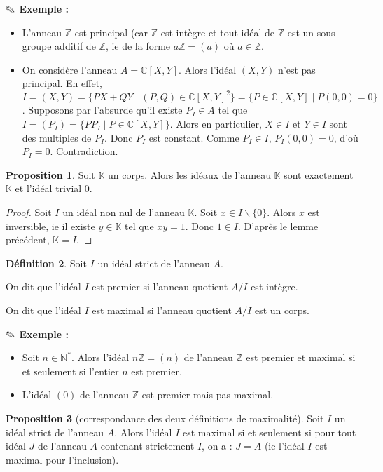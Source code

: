 \documentclass{article}
\newcommand{\Z}{\mathbb{Z}}
\newcommand{\C}{\mathbb{C}}
\newcommand{\K}{\mathbb{K}}
\newcommand{\N}{\mathbb{N}}
\theoremstyle{definition}
\newtheorem{defi}{Définition}[section]
\newtheorem{prop}[defi]{Proposition}
\theoremstyle{remark}
\newcommand{\exem}{{\textbf{$\text{\ding{46}}$ Exemple : \ }}}
\begin{document}
\exem 
\begin{itemize}
\item L'anneau $\Z$ est principal (car $\Z$ est intègre et tout idéal de $\Z$ est un sous-groupe additif de $\Z$, ie de la forme $a\Z=(a)$ où $a\in \Z$.
\item On considère l'anneau $A=\C[X,Y]$. Alors l'idéal $(X,Y)$ n'est pas principal. En effet, $I=(X,Y)=\{PX+QY \mid (P,Q) \in \C[X,Y]^2\}=\{P \in \C[X,Y] \mid P(0,0)=0\}$. Supposons par l'absurde qu'il existe $P_I \in A$ tel que $I=(P_I)=\{PP_I \mid P \in \C[X,Y]\}$. Alors en particulier, $X \in I$ et $Y\in I$ sont des multiples de $P_I$. Donc $P_I$ est constant. Comme $P_I \in I$, $P_I(0,0)=0$, d'où $P_I=0$. Contradiction.
\end{itemize}

\begin{prop}
Soit $ \K$ un corps. Alors les idéaux de l'anneau $\K$ sont exactement $\K$ et l'idéal trivial ${0}$.
\end{prop}

\begin{proof}
Soit $I$ un idéal non nul de l'anneau $\K$. Soit $x \in I \backslash \{0\}$. Alors $x$ est inversible, ie il existe $y \in \K$ tel que $xy=1$. Donc $1 \in I$. D'après le lemme précédent, $\K=I$.
\end{proof}

\begin{defi}
Soit $I$ un idéal strict de l'anneau $A$.
\begin{point}
\item On dit que l'idéal $I$ est premier si l'anneau quotient $A/I$ est intègre.
\item On dit que l'idéal $I$ est maximal si l'anneau quotient $A/I$ est un corps.
\end{point}
\end{defi}

\exem \begin{itemize}
\item Soit $n \in \N^*$. Alors l'idéal $n\Z=(n)$ de l'anneau $\Z$ est premier et maximal si et seulement si l'entier $n$ est premier.
\item L'idéal $(0)$ de l'anneau $\Z$ est premier mais pas maximal.
\end{itemize}

\begin{prop}[correspondance des deux définitions de maximalité]
Soit $I$ un idéal strict de l'anneau $A$. Alors l'idéal $I$ est maximal si et seulement si pour tout idéal $J$ de l'anneau $A$ contenant strictement $I$, on a : $J=A$ (ie l'idéal $I$ est maximal pour l'inclusion).
\end{prop}
\end{document}
